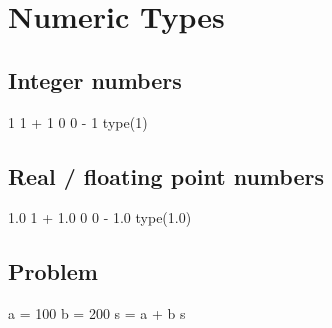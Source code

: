 \documentclass[aspectratio=1610,slidestop]{beamer}
\begin{document}
\subsection{ }
\begin{pframe}
 \begin{center}
   
 \end{center}
\end{pframe}

\section{Numeric Types}
\makeTableOfContentsSection

\subsection{Integer numbers}
\begin{pframe}
\begin{pyconsole}
1
1 + 1
0
0 - 1
type(1)
\end{pyconsole}

\end{pframe}

\subsection{Real / floating point numbers}
\begin{pframe}
\begin{pyconsole}
1.0
1 + 1.0
0
0 - 1.0
type(1.0)
\end{pyconsole}
\end{pframe}

\subsection{Problem}
\begin{pframe}
\begin{minipage}[t]{0.47\textwidth}

\end{minipage}
\begin{minipage}[t]{0.47\textwidth}
\vspace{-5cm}
\begin{pyconsole}
a = 100
b = 200
s = a + b
s
\end{pyconsole}
\end{minipage}
\end{pframe}
\end{document}
